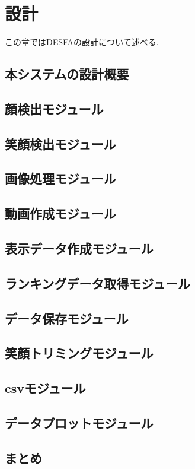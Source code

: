\chapter{設計}
\label{chap:function}

この章ではDESFAの設計について述べる.

\section{本システムの設計概要}
\section{顔検出モジュール}
\section{笑顔検出モジュール}
\section{画像処理モジュール}
\section{動画作成モジュール}
\section{表示データ作成モジュール}
\section{ランキングデータ取得モジュール}
\section{データ保存モジュール}
\section{笑顔トリミングモジュール}
\section{csvモジュール}
\section{データプロットモジュール}
\section{まとめ}
